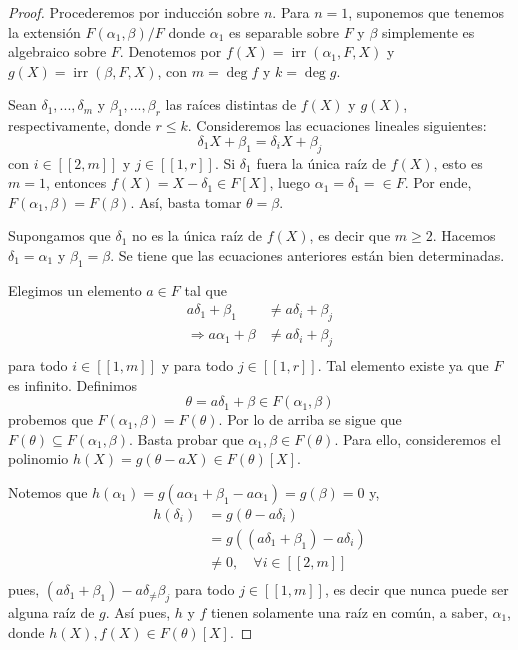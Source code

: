 \documentclass[12pt]{report}
\theoremstyle{largebreak}
\newcommand\natint[1]{\ensuremath{\left[\!\left[ #1\right]\!\right]}}
\DeclareMathOperator{\irr}{irr}
\begin{document}
    \begin{proof}
        Procederemos por inducción sobre $n$. Para $n=1$, suponemos que tenemos la extensión $F(\alpha_1,\beta)/F$ donde $\alpha_1$ es separable sobre $F$ y $\beta$ simplemente es algebraico sobre $F$. Denotemos por $f(X)=\irr\left(\alpha_1,F,X \right)$ y $g(X)=\irr\left(\beta,F,X \right)$, con $m=\deg f$ y $k=\deg g$.

        Sean $\delta_1,...,\delta_m$ y $\beta_1,...,\beta_r$ las raíces distintas de $f(X)$ y $g(X)$, respectivamente, donde $r\leq k$.
        Consideremos las ecuaciones lineales siguientes:
        \begin{equation*}
            \delta_1X+\beta_1=\delta_iX+\beta_j
        \end{equation*}
        con $i\in\natint{2,m}$ y $j\in\natint{1,r}$. Si $\delta_1$ fuera la única raíz de $f(X)$, esto es $m=1$, entonces $f(X)=X-\delta_1\in F[X]$, luego $\alpha_1=\delta_1=\in F$. Por ende, $F(\alpha_1,\beta)=F(\beta)$. Así, basta tomar $\theta=\beta$.

        Supongamos que $\delta_1$ no es la única raíz de $f(X)$, es decir que $m\geq 2$. Hacemos $\delta_1=\alpha_1$ y $\beta_1=\beta$. Se tiene que las ecuaciones anteriores están bien determinadas.

        Elegimos un elemento $a\in F$ tal que
        \begin{equation*}
            \begin{split}
                a\delta_1+\beta_1&\neq a\delta_i+\beta_j\\
                \Rightarrow a\alpha_1+\beta&\neq a\delta_i+\beta_j\\
            \end{split}
        \end{equation*}
        para todo $i\in\natint{1,m}$ y para todo $j\in\natint{1,r}$. Tal elemento existe ya que $F$ es infinito. Definimos
        \begin{equation*}
            \theta=a\delta_1+\beta\in F(\alpha_1,\beta)
        \end{equation*}
        probemos que $F(\alpha_1,\beta)=F(\theta)$. Por lo de arriba se sigue que $F(\theta)\subseteq F(\alpha_1,\beta)$. Basta probar que $\alpha_1,\beta\in F(\theta)$. Para ello, consideremos el polinomio $h(X)=g(\theta-aX)\in F(\theta)[X]$.

        Notemos que $h(\alpha_1)=g(a\alpha_1+\beta_1-a\alpha_1)=g(\beta)=0$ y,
        \begin{equation*}
            \begin{split}
                h(\delta_i)&=g(\theta-a\delta_i)\\
                &=g((a\delta_1+\beta_1)-a\delta_i)\\
                &\neq 0,\quad\forall i\in\natint{2,m} \\
            \end{split}
        \end{equation*}
        pues, $(a\delta_1+\beta_1)-a\delta_\neq\beta_j$ para todo $j\in\natint{1,m}$, es decir que nunca puede ser alguna raíz de $g$. Así pues, $h$ y $f$ tienen solamente una raíz en común, a saber, $\alpha_1$, donde $h(X),f(X)\in F(\theta)[X]$.


\end{proof}
\end{document}
